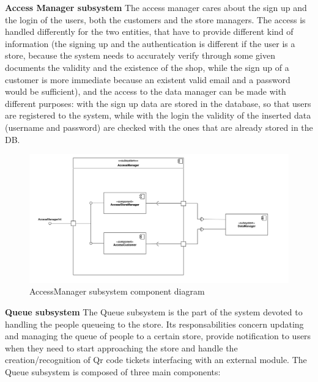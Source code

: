 \documentclass[]{article}
\begin{document}
	\textbf{Access Manager subsystem} \newline
	The access manager cares about the sign up and the login of the users, both the customers and the store managers. The access is handled differently for the two entities, that have to provide different kind of information (the signing up and the authentication is different if the user is a store, because the system needs to accurately verify through some given documents the validity and the existence of the shop, while the sign up of a customer is more immediate because an existent valid email and a password would be sufficient), and the access to the data manager can be made with different purposes: with the sign up data are stored in the database, so that users are registered to the system, while with the login the validity of the inserted data (username and password) are checked with the ones that are already stored in the DB. 

	\begin{figure}[H]
			\centering
			\includegraphics[scale=0.6]{ComponentView/AccessManagerComponent.png}
			\caption{AccessManager subsystem component diagram}
			\label{fig:AccessManagerDiagram}
		\end{figure}
		\bigskip\bigskip
	
	
	\textbf{Queue subsystem} \newline
	The Queue subsystem is the part of the system devoted to handling the people queueing to the store.
	Its responsabilities concern updating and managing the queue of people to a certain store, provide notification to users when they need to start approaching the store and handle the creation/recognition of Qr code tickets interfacing with an external module.
	The Queue subsystem is composed of three main components:
	
\end{document}
